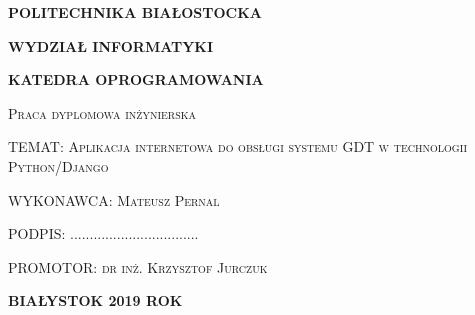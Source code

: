  \begin{titlepage}

{\thispagestyle{empty} \setlength{\parskip}{1cm}
\begin{center}
{\LARGE{\textbf{POLITECHNIKA BIAŁOSTOCKA}}}
\end{center}
\setlength{\parskip}{0.5cm}
\begin{center} {\large{\textbf{WYDZIAŁ INFORMATYKI}}}
\end{center}
\begin{center}
{\large{\textbf{KATEDRA OPROGRAMOWANIA}}}
\end{center}
\setlength{\parskip}{2cm}
\begin{center}
{\LARGE{\textsc{Praca dyplomowa inżynierska}}}
\end{center}
\begin{center}
{\large{\textsc{TEMAT: Aplikacja internetowa do obsługi systemu
GDT w technologii Python/Django}}}
\end{center}


\setlength{\parskip}{2cm}
\begin{flushright}
{\large{\textsc{WYKONAWCA: Mateusz Pernal}}}
\end{flushright}
\setlength{\parskip}{1.5cm}
\begin{flushright}
{\large{PODPIS: .................................}}
\end{flushright}
\setlength{\parskip}{2cm}
\begin{flushleft}
{\large{\textsc{PROMOTOR: dr inż. Krzysztof Jurczuk}}}
\end{flushleft}
\begin{center}
{\large{\textsc{\textbf{BIAŁYSTOK  2019 ROK}}}}
\end{center}
}
\end{titlepage}

